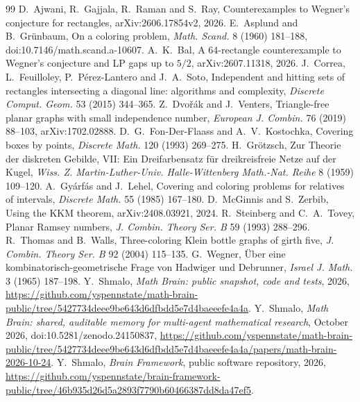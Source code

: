 \documentclass[11pt]{article}
\theoremstyle{remark}
\begin{document}
\begin{thebibliography}{99}
 D.~Ajwani, R.~Gajjala, R.~Raman and S.~Ray, Counterexamples to Wegner's conjecture for rectangles, arXiv:2606.17854v2, 2026.
 E.~Asplund and B.~Gr\"unbaum, On a coloring problem, \emph{Math. Scand.} 8 (1960) 181--188, doi:10.7146/math.scand.a-10607.
 A.~K.~Bal, A $64$-rectangle counterexample to Wegner's conjecture and LP gaps up to $5/2$, arXiv:2607.11318, 2026.
 J.~Correa, L.~Feuilloley, P.~P\'erez-Lantero and J.~A.~Soto, Independent and hitting sets of rectangles intersecting a diagonal line: algorithms and complexity, \emph{Discrete Comput. Geom.} 53 (2015) 344--365.
 Z.~Dvo\v{r}\'ak and J.~Venters, Triangle-free planar graphs with small independence number, \emph{European J. Combin.} 76 (2019) 88--103, arXiv:1702.02888.
 D.~G.~Fon-Der-Flaass and A.~V.~Kostochka, Covering boxes by points, \emph{Discrete Math.} 120 (1993) 269--275.
 H.~Gr\"otzsch, Zur Theorie der diskreten Gebilde, VII: Ein Dreifarbensatz f\"ur dreikreisfreie Netze auf der Kugel, \emph{Wiss. Z. Martin-Luther-Univ. Halle-Wittenberg Math.-Nat. Reihe} 8 (1959) 109--120.
 A.~Gy\'arf\'as and J.~Lehel, Covering and coloring problems for relatives of intervals, \emph{Discrete Math.} 55 (1985) 167--180.
 D.~McGinnis and S.~Zerbib, Using the KKM theorem, arXiv:2408.03921, 2024.
 R.~Steinberg and C.~A.~Tovey, Planar Ramsey numbers, \emph{J. Combin. Theory Ser. B} 59 (1993) 288--296.
 R.~Thomas and B.~Walls, Three-coloring Klein bottle graphs of girth five, \emph{J. Combin. Theory Ser. B} 92 (2004) 115--135.
 G.~Wegner, \"Uber eine kombinatorisch-geometrische Frage von Hadwiger und Debrunner, \emph{Israel J. Math.} 3 (1965) 187--198.
 Y.~Shmalo, \emph{Math Brain: public snapshot, code and tests}, 2026, \url{https://github.com/yspennstate/math-brain-public/tree/5427734deee9be643d6dfbdd5e7d4baeeefe4a4a}.
 Y.~Shmalo, \emph{Math Brain: shared, auditable memory for multi-agent mathematical research}, October 2026, doi:10.5281/zenodo.24150837, \url{https://github.com/yspennstate/math-brain-public/tree/5427734deee9be643d6dfbdd5e7d4baeeefe4a4a/papers/math-brain-2026-10-24}.
 Y.~Shmalo, \emph{Brain Framework}, public software repository, 2026, \url{https://github.com/yspennstate/brain-framework-public/tree/46b935d26d5a2893f7790b60466387dd8da47ef5}.
\end{thebibliography}
\end{document}
